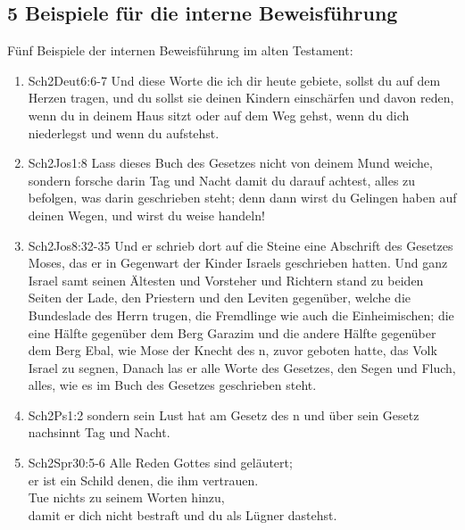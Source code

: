 \subsection{5 Beispiele für die interne Beweisführung}
Fünf Beispiele der internen Beweisführung im alten Testament:
\renewcommand{\labelenumi}{\Roman{enumi}}
\begin{enumerate}
	\item  
	\begin{bibeltext}{Sch2}{Deut}{6:6-7}
		Und diese Worte die ich dir heute gebiete, sollst du auf dem Herzen tragen, und du sollst sie deinen Kindern einschärfen und davon reden, wenn du in deinem Haus sitzt oder auf dem Weg gehst, wenn du dich niederlegst und wenn du aufstehst.
	\end{bibeltext}
	\item 
	\begin{bibeltext}{Sch2}{Jos}{1:8}
		Lass dieses Buch des Gesetzes nicht von deinem Mund weiche, sondern forsche darin Tag und Nacht damit du darauf achtest, alles zu befolgen, was darin geschrieben steht; denn dann wirst du Gelingen haben auf deinen Wegen, und wirst du weise handeln!
	\end{bibeltext}
	\item 
	\begin{bibeltext}{Sch2}{Jos}{8:32-35}
		Und er schrieb dort auf die Steine eine Abschrift des Gesetzes Moses, das er in Gegenwart der Kinder Israels geschrieben hatten. Und ganz Israel samt seinen Ältesten und Vorsteher und Richtern stand zu beiden Seiten der Lade, den Priestern und den Leviten gegenüber, welche die Bundeslade des Herrn trugen, die Fremdlinge wie auch die Einheimischen; die eine Hälfte gegenüber dem Berg Garazim und die andere Hälfte gegenüber dem Berg Ebal, wie Mose der Knecht des \herr n, zuvor geboten hatte, das Volk Israel zu segnen, Danach las er alle Worte des Gesetzes, den Segen und Fluch, alles, wie es im Buch des Gesetzes geschrieben steht.
	\end{bibeltext}
\item 
	\begin{bibeltext}{Sch2}{Ps}{1:2}
		sondern sein Lust hat am Gesetz des \herr n und über sein Gesetz nachsinnt Tag und Nacht.
	\end{bibeltext}
\item 
	\begin{bibeltext}{Sch2}{Spr}{30:5-6}
		Alle Reden Gottes sind geläutert;\\
		er ist ein Schild denen, die ihm vertrauen.\\
		Tue nichts zu seinem Worten hinzu,\\
		damit er dich nicht bestraft und du als Lügner dastehst.\\
	\end{bibeltext}
\end{enumerate}
